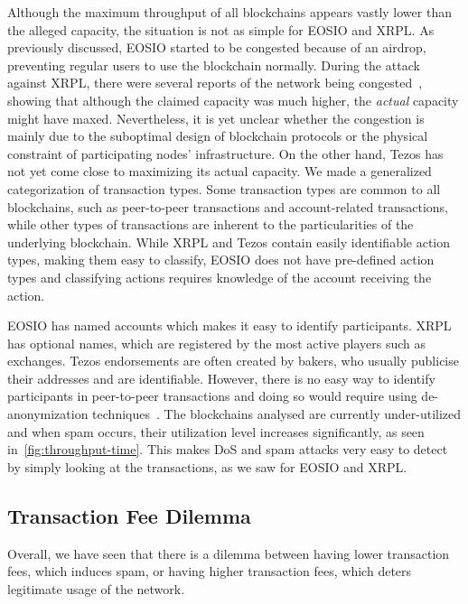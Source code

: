 Although the maximum throughput of all blockchains appears vastly lower than the alleged capacity, the situation is not as simple for EOSIO and XRPL. As previously discussed, EOSIO started to be congested because of an airdrop, preventing regular users to use the blockchain normally.
During the attack against XRPL, there were several reports of the network being congested~\cite{AtoZMarkets2019, Tulo2019}, showing that although the claimed capacity was much higher, the {\em actual} capacity might have maxed. Nevertheless, it is yet unclear whether the congestion is mainly due to the suboptimal design of blockchain protocols or the physical constraint of participating nodes' infrastructure. 
On the other hand, Tezos has not yet come close to maximizing its actual capacity.
We made a generalized categorization of transaction types.
Some transaction types are common to all blockchains, such as peer-to-peer transactions and account-related transactions, while other types of transactions are inherent to the particularities of the underlying blockchain. While XRPL and Tezos contain easily identifiable action types, making them easy to classify, EOSIO does not have pre-defined action types and classifying actions requires knowledge of the account receiving the action.

EOSIO has named accounts which makes it easy to identify participants.
XRPL has optional names, which are registered by the most active players such as exchanges.
Tezos endorsements are often created by bakers, who usually publicise their addresses and are identifiable. However, there is no easy way to identify participants in peer-to-peer transactions and doing so would require using de-anonymization techniques~\cite{10.1145/2660267.2660379,8802640}.
The blockchains analysed are currently under-utilized and when spam occurs, their utilization level increases significantly, as seen in~\autoref{fig:throughput-time}. This makes DoS and spam attacks very easy to detect by simply looking at the transactions, as we saw for EOSIO and XRPL.

\subsection{Transaction Fee Dilemma}
Overall, we have seen that there is a dilemma between having lower transaction fees, which induces spam, or having higher transaction fees, which deters legitimate usage of the network.

